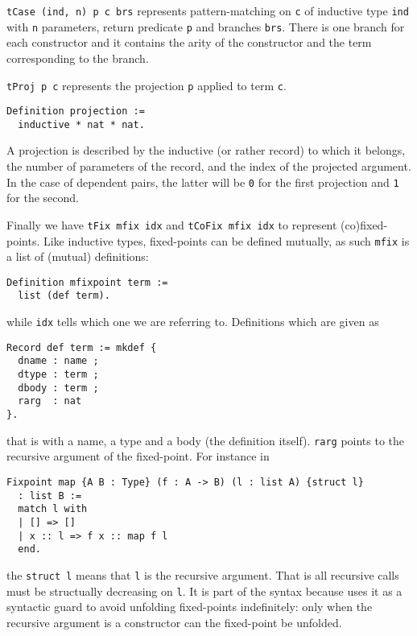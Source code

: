 \texttt{tCase (ind, n) p c brs} represents pattern-matching on
\texttt{c} of inductive type \texttt{ind} with
\texttt{n} parameters, return predicate \texttt{p}
and branches \texttt{brs}.
There is one branch for each constructor and it contains the arity of the
constructor and the term corresponding to the branch.

\texttt{tProj p c} represents the projection \texttt{p}
applied to term \texttt{c}.
\begin{verbatim}
Definition projection :=
  inductive * nat * nat.
\end{verbatim}
A projection is described by the inductive (or rather record) to which it
belongs, the number of parameters of the record, and the index of the projected
argument. In the case of dependent pairs, the latter will be \texttt{0}
for the first projection and \texttt{1} for the second.

Finally we have \texttt{tFix mfix idx} and
\texttt{tCoFix mfix idx} to represent (co)fixed-points.
Like inductive types, fixed-points can be defined mutually, as such
\texttt{mfix} is a list of (mutual) definitions:
\begin{verbatim}
Definition mfixpoint term :=
  list (def term).
\end{verbatim}
while \texttt{idx} tells which one we are referring to.
Definitions which are given as
\begin{verbatim}
Record def term := mkdef {
  dname : name ;
  dtype : term ;
  dbody : term ;
  rarg  : nat
}.
\end{verbatim}
that is with a name, a type and a body (the definition itself).
\texttt{rarg} points to the recursive argument of the fixed-point.
For instance in
\begin{verbatim}
Fixpoint map {A B : Type} (f : A -> B) (l : list A) {struct l}
  : list B :=
  match l with
  | [] => []
  | x :: l => f x :: map f l
  end.
\end{verbatim}
the \texttt{{struct l}} means that \texttt{l} is the recursive
argument. That is all recursive calls must be structually decreasing on
\texttt{l}. It is part of the syntax because \Coq uses it as a
syntactic guard to avoid unfolding fixed-points indefinitely: only when the
recursive argument is a constructor can the fixed-point be unfolded.

